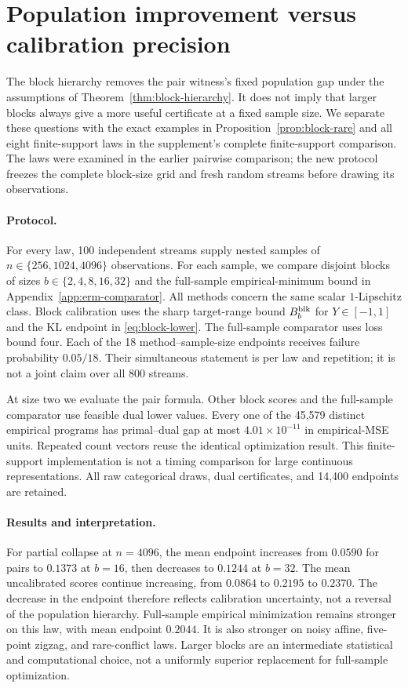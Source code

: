 \section{Population improvement versus calibration precision}
\label{sec:block-experiments}

The block hierarchy removes the pair witness's fixed population gap under
the assumptions of Theorem~\ref{thm:block-hierarchy}. It does not imply that
larger blocks always give a more useful certificate at a fixed sample size.
We separate these questions with the exact examples in
Proposition~\ref{prop:block-rare} and all eight finite-support laws in
the supplement's complete finite-support comparison. The laws were examined in the earlier
pairwise comparison; the new protocol freezes the complete block-size grid
and fresh random streams before drawing its observations.

\paragraph{Protocol.}
For every law, 100 independent streams supply nested samples of
$n\in\{256,1024,4096\}$ observations. For each sample, we compare disjoint
blocks of sizes $b\in\{2,4,8,16,32\}$ and the full-sample empirical-minimum
bound in Appendix~\ref{app:erm-comparator}. All methods concern the same
scalar $1$-Lipschitz class. Block calibration uses the sharp target-range
bound $B_b^{\rm blk}$ for $Y\in[-1,1]$ and the KL endpoint in
\eqref{eq:block-lower}. The full-sample comparator uses loss bound four.
Each of the 18 method--sample-size endpoints receives failure probability
$0.05/18$. Their simultaneous statement is per law and repetition; it is
not a joint claim over all 800 streams.

At size two we evaluate the pair formula. Other block scores and the
full-sample comparator use feasible dual lower values. Every one of the
45,579 distinct empirical programs has primal--dual gap at most
$4.01\times10^{-11}$ in empirical-MSE units. Repeated count vectors reuse
the identical optimization result. This finite-support implementation is
not a timing comparison for large continuous representations. All raw
categorical draws, dual certificates, and 14,400 endpoints are retained.



\paragraph{Results and interpretation.}
For partial collapse at $n=4096$, the mean endpoint increases from
$0.0590$ for pairs to $0.1373$ at $b=16$, then decreases to $0.1244$ at
$b=32$. The mean uncalibrated scores continue increasing, from $0.0864$
to $0.2195$ to $0.2370$. The decrease in the endpoint therefore reflects
calibration uncertainty, not a reversal of the population hierarchy.
Full-sample empirical minimization remains stronger on this law, with mean
endpoint $0.2044$. It is also stronger on noisy affine, five-point zigzag,
and rare-conflict laws. Larger blocks are an intermediate statistical and
computational choice, not a uniformly superior replacement for full-sample
optimization.

